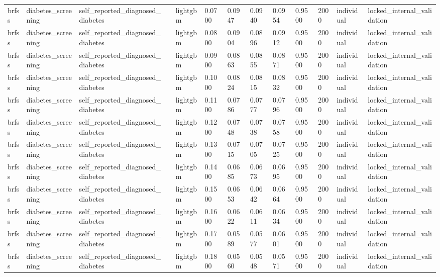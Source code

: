 \begin{tabular}{lllllllllllll}
brfss & diabetes\_screening & self\_reported\_diagnosed\_diabetes &  & lightgbm & 0.0700 & 0.0947 & 0.0940 & 0.0954 & 0.9500 & 2000 & individual & locked\_internal\_validation \\
brfss & diabetes\_screening & self\_reported\_diagnosed\_diabetes &  & lightgbm & 0.0800 & 0.0904 & 0.0896 & 0.0912 & 0.9500 & 2000 & individual & locked\_internal\_validation \\
brfss & diabetes\_screening & self\_reported\_diagnosed\_diabetes &  & lightgbm & 0.0900 & 0.0863 & 0.0855 & 0.0871 & 0.9500 & 2000 & individual & locked\_internal\_validation \\
brfss & diabetes\_screening & self\_reported\_diagnosed\_diabetes &  & lightgbm & 0.1000 & 0.0824 & 0.0815 & 0.0832 & 0.9500 & 2000 & individual & locked\_internal\_validation \\
brfss & diabetes\_screening & self\_reported\_diagnosed\_diabetes &  & lightgbm & 0.1100 & 0.0786 & 0.0777 & 0.0796 & 0.9500 & 2000 & individual & locked\_internal\_validation \\
brfss & diabetes\_screening & self\_reported\_diagnosed\_diabetes &  & lightgbm & 0.1200 & 0.0748 & 0.0738 & 0.0758 & 0.9500 & 2000 & individual & locked\_internal\_validation \\
brfss & diabetes\_screening & self\_reported\_diagnosed\_diabetes &  & lightgbm & 0.1300 & 0.0715 & 0.0705 & 0.0725 & 0.9500 & 2000 & individual & locked\_internal\_validation \\
brfss & diabetes\_screening & self\_reported\_diagnosed\_diabetes &  & lightgbm & 0.1400 & 0.0685 & 0.0673 & 0.0695 & 0.9500 & 2000 & individual & locked\_internal\_validation \\
brfss & diabetes\_screening & self\_reported\_diagnosed\_diabetes &  & lightgbm & 0.1500 & 0.0653 & 0.0642 & 0.0664 & 0.9500 & 2000 & individual & locked\_internal\_validation \\
brfss & diabetes\_screening & self\_reported\_diagnosed\_diabetes &  & lightgbm & 0.1600 & 0.0622 & 0.0611 & 0.0634 & 0.9500 & 2000 & individual & locked\_internal\_validation \\
brfss & diabetes\_screening & self\_reported\_diagnosed\_diabetes &  & lightgbm & 0.1700 & 0.0589 & 0.0577 & 0.0601 & 0.9500 & 2000 & individual & locked\_internal\_validation \\
brfss & diabetes\_screening & self\_reported\_diagnosed\_diabetes &  & lightgbm & 0.1800 & 0.0560 & 0.0548 & 0.0571 & 0.9500 & 2000 & individual & locked\_internal\_validation \\

\end{tabular}

